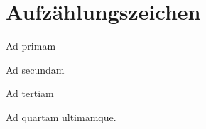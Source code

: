 \documentclass[10pt,%
  a4paper,%
  twoside,%
  openany%
  ]{book}
\begin{document}
\begin{multicols}{2}
\lipsum[1]

\begin{paperbox}{\paperimagequad}
  \lipsum[1]
\end{paperbox}

\section{Aufzählungszeichen}

\begin{paperbox}{\paperimagequad}
    \begin{dsalist}
      \item Ad primam
      \item Ad secundam
      \item Ad tertiam
      \item Ad quartam ultimamque.
      \item \lipsum[1]
    \end{dsalist}
\end{paperbox}

\end{multicols}
\begin{paperbox}{\paperimagequad}
  \begin{multicols}{2}
    \begin{dsalist}
      \item \lipsum[1]
      \item \lipsum[1]
      \item \lipsum[1]
    \end{dsalist}
  \end{multicols}
\end{paperbox}
\end{document}
